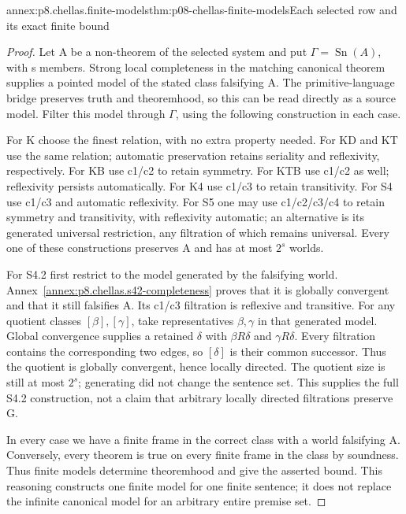 \begin{annexitem}{annex:p8.chellas.finite-models}{thm:p08-chellas-finite-models}{Each selected row and its exact finite bound}
\begin{proof}
Let A be a non-theorem of the selected system and put
\(\Gamma=\operatorname{Sn}(A)\), with s members.
Strong local completeness in the matching canonical theorem supplies
a pointed model of the stated class falsifying A. The primitive-language
bridge preserves truth and theoremhood, so this can be read directly
as a source model. Filter this model through \(\Gamma\), using the
following construction in each case.

For K choose the finest relation, with no extra property needed.
For KD and KT use the same relation; automatic preservation retains
seriality and reflexivity, respectively. For KB use c1/c2 to retain
symmetry. For KTB use c1/c2 as well; reflexivity persists automatically.
For K4 use c1/c3 to retain transitivity. For S4 use c1/c3 and
automatic reflexivity. For S5 one may use c1/c2/c3/c4 to retain
symmetry and transitivity, with reflexivity automatic; an alternative
is its generated universal restriction, any filtration of which
remains universal. Every one of these constructions preserves A
and has at most \(2^s\) worlds.

For S4.2 first restrict to the model generated by the falsifying
world. Annex~\ref{annex:p8.chellas.s42-completeness} proves that it
is globally convergent and that it still falsifies A. Its c1/c3
filtration is reflexive and transitive. For any quotient classes
\([\beta],[\gamma]\), take representatives \(\beta,\gamma\)
in that generated model. Global convergence supplies a retained
\(\delta\) with \(\beta R\delta\) and
\(\gamma R\delta\). Every filtration contains the corresponding
two edges, so \([\delta]\) is their common successor.
Thus the quotient is globally convergent, hence locally directed.
The quotient size is still at most \(2^s\); generating did not
change the sentence set. This supplies the full S4.2 construction,
not a claim that arbitrary locally directed filtrations preserve G.

In every case we have a finite frame in the correct class with a
world falsifying A. Conversely, every theorem is true on every
finite frame in the class by soundness. Thus finite models determine
theoremhood and give the asserted bound. This reasoning constructs
one finite model for one finite sentence; it does not replace the
infinite canonical model for an arbitrary entire premise set.
\end{proof}
\end{annexitem}

